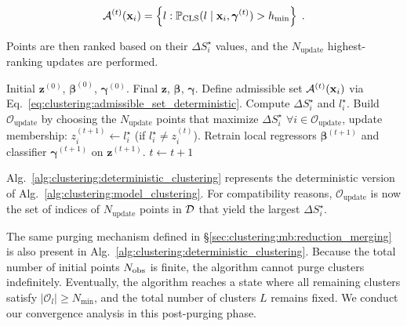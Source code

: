 \begin{equation}
  \mathcal{A}^{(t)}(\mathbf{x}_i) = \left\{ l : \mathbb{P}_{\mathrm{CLS}}(l \mid \mathbf{x}_i, \boldsymbol{\gamma}^{(t)}) > h_{\min} \right\} \;.
  \label{eq:clustering:admissible_set_deterministic}
\end{equation}


Points are then ranked based on their $\Delta S_i^\star$ values, and the $N_{\mathrm{update}}$ highest-ranking updates are performed.

\begin{algorithm}[htbp]
  \caption{Deterministic Model-Based Clustering ($T=0$)}
  \label{alg:clustering:deterministic_clustering}
  \begin{algorithmic}[1]
    \Require Initial $\mathbf{z}^{(0)}$, $\boldsymbol{\beta}^{(0)}$, $\boldsymbol{\gamma}^{(0)}$.
    \Ensure Final $\mathbf{z}$, $\boldsymbol{\beta}$, $\boldsymbol{\gamma}$.
        \State Define admissible set $\mathcal{A}^{(t)}(\mathbf{x}_i)$ via Eq.~\eqref{eq:clustering:admissible_set_deterministic}.
        \State Compute $\Delta S_i^\star$ and $l^\star_i$.
      \EndFor
      \State Build $\mathcal{O}_{\mathrm{update}}$ by choosing the $N_{\mathrm{update}}$ points that maximize $\Delta S_i^\star$
      \State $\forall i \in \mathcal{O}_{\mathrm{update}}$, update membership: $z_i^{(t+1)} \gets l^\star_i$ (if $l^\star_i \neq z_i^{(t)}$).
      \State Retrain local regressors $\boldsymbol{\beta}^{(t+1)}$ and classifier $\boldsymbol{\gamma}^{(t+1)}$ on $\mathbf{z}^{(t+1)}$.
      \State $t \gets t + 1$
    \EndWhile
  \end{algorithmic}
\end{algorithm}

Alg.~\ref{alg:clustering:deterministic_clustering} represents the deterministic version of Alg.~\ref{alg:clustering:model_clustering}. For compatibility reasons, $\mathcal{O}_{\mathrm{update}}$ is now the set of indices of $N_{\mathrm{update}}$ points in $\mathcal{D}$ that yield the largest $\Delta S_i^\star$.

\smallskip
The same purging mechanism defined in \S\ref{sec:clustering:mb:reduction_merging} is also present in Alg.~\ref{alg:clustering:deterministic_clustering}. Because the total number of initial points $N_{\mathrm{obs}}$ is finite, the algorithm cannot purge clusters indefinitely. Eventually, the algorithm reaches a state where all remaining clusters satisfy $|\mathcal{O}_l| \geq N_{\min}$, and the total number of clusters $L$ remains fixed. We conduct our convergence analysis in this post-purging phase.


